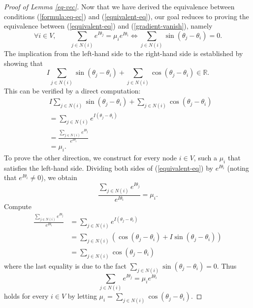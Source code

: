 \documentclass[11pt,reqno]{amsart}
\theoremstyle{definition}
\begin{document}
\begin{proof}[Proof of Lemma \ref{eq-vec}]
Now that we have derived the equivalence between conditions (\ref{formula:eq-ec}) and (\ref{equivalent-eq}), our goal reduces to proving the equivalence between (\ref{equivalent-eq}) and (\ref{gradient-vanish}), namely
\[ \forall i\in V,\qquad \sum_{j\in N(i)}e^{I\theta_j} = \mu_i e^{I\theta_i} \Longleftrightarrow \sum_{j\in N(i)}\sin(\theta_j-\theta_i) = 0. \]
The implication from the left-hand side to the right-hand side is established by showing that
\[
I\sum_{j\in N(i)} \sin(\theta_j-\theta_i ) + \sum_{j\in N(i)}\cos(\theta_j-\theta_i) \in \mathbb{R}.
\]
This can be verified by a direct computation: $$\begin{aligned}
        & I\sum_{j\in N(i)} \sin(\theta_j-\theta_i) + \sum_{j\in N(i)}\cos(\theta_j-\theta_i)\\
        &= \sum_{j\in N(i)}e^{I(\theta_j-\theta_i)}\\
        &= \frac{\sum_{j\in N(i)} e^{I\theta_j}}{e^{I\theta_i}}\\
        &= \mu_i.
    \end{aligned}$$
To prove the other direction, we construct for every node $i\in V$, such a \(\mu_i\) that satisfies the left-hand side. 
Dividing both sides of (\ref{equivalent-eq}) by \( e^{I\theta_i} \) (noting that \( e^{I\theta_i} \neq 0 \)), we obtain \[ \frac{\sum_{j\in N(i)} e^{I\theta_j}}{e^{I\theta_i}} = \mu_i. \]
Compute $$
\begin{aligned}
    \frac{ \sum_{j\in N(i)} e^{I\theta_j}}{e^{I\theta_i}} &= \sum_{j\in N(i)} e^{I(\theta_j - \theta_i)}\\
    &= \sum_{j\in N(i)} (\cos(\theta_j - \theta_i) + I\sin(\theta_j - \theta_i))\\
    &= \sum_{j\in N(i)} \cos(\theta_j - \theta_i)
\end{aligned}
$$
where the last equality is due to the fact $\sum_{j\in N(i)}\sin(\theta_j-\theta_i)=0$.
Thus $$\sum_{j\in N(i)}e^{I\theta_j} = \mu_i e^{I\theta_i}$$ holds for every $i\in V$ by letting $\mu_i=\sum_{j\in N(i)}\cos(\theta_j-\theta_i)$.
\end{proof}
\end{document}
